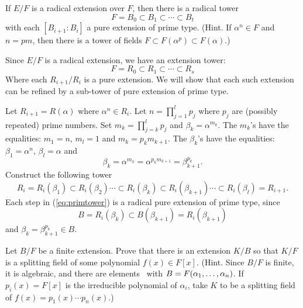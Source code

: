 \begin{myenumerate}

\item
\begin{excopy}
If \(E/F\) is a radical extension over $F$, then there is a radical tower
\begin{equation*}
F = B_0 \subset B_1 \subset \cdots \subset B_t
\end{equation*}
with each \([B_{i+1}:B_i]\) a pure extension of prime type.
(Hint. If \(\alpha^n\in F\) and \(n=pm\), then there is a tower of fields
\(F\subset F(\alpha^p)\subset F(\alpha)\).)
\end{excopy}

Since \(E/F\) is a radical extension, we have an extension tower:
\begin{equation*}
F = R_0 \subset R_1 \subset \cdots \subset R_s
\end{equation*}
Where each \(R_{i+1}/R_i\) is a pure extension.
We will show that each such extension can be refined by
a sub-tower of pure extension of prime type.

Let \(R_{i+1}=R(\alpha)\) where \(\alpha^n\in R_i\).
Let \(n=\prod_{j=1}^l p_j\)
where \(p_j\) are (possibly repeated) prime numbers.
Set \(m_k = \prod_{j=k}^l p_j\)
and \(\beta_k = \alpha^{m_k}\).
The \(m_k\)'s have the equalities:
\(m_1 = n\), \(m_l = 1\) and \(m_k = p_k m_{k+1} \).
The \(\beta_k\)'s have the equalities:
\(\beta_1 = \alpha^n\),
\(\beta_l = \alpha\) and
\[\beta_k = \alpha^{m_k} = \alpha^{p_k m_{k+1}} = \beta_{k+1}^{p_k}.\]
Construct the following tower
\begin{equation} \label{eq:primtower}
R_i = R_i(\beta_1)
   \subset R_i(\beta_2)
   \cdots \subset R_i(\beta_k) \subset R_i(\beta_{k+1}) \cdots
   \subset R_i(\beta_l) = R_{i+1}.
\end{equation}
Each step in (\ref{eq:primtower}) is a radical pure extension of prime type,
since
\[B = R_i(\beta_k)  \subset B(\beta_{k+1}) =  R_i(\beta_{k+1})\]
and \(\beta_k = \beta_{k+1}^{p_k} \in B\).


\item
\begin{excopy}
Let \(B/F\) be a finite extension. Prove that there is an extension \(K/B\)
so that \(K/F\) is a splitting field  of some polynomial \(f(x)\in F[x]\).
(Hint. Since \(B/F\) is finite, it is algebraic, and there are elements
\seqalphn\ with \(B=F(\alpha_1,\ldots,\alpha_{n})\). If \(p_i(x)=F[x]\) is the irreducible
polynomial of \(\alpha_i\),
take $K$ to be a splitting field of \(f(x)=p_1(x)\cdots p_n(x)\).)
\end{excopy}


\end{myenumerate}
